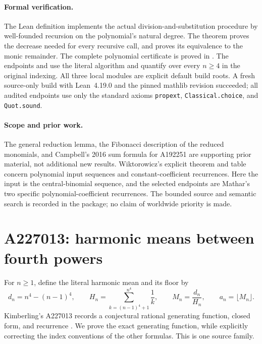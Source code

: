 \documentclass[11pt]{article}
\begin{document}
\paragraph{Formal verification.}
The Lean definition  implements the actual
division-and-substitution procedure by well-founded recursion on the
polynomial's natural degree. The theorem
 proves the decrease needed for every
recursive call, and  proves its
equivalence to the monic remainder. The complete polynomial certificate
is proved in . The endpoints
 and  use the
literal algorithm and quantify over every $n\geq4$ in the original
indexing. All three local modules are explicit default build roots.
A fresh source-only build with Lean~4.19.0 and the pinned mathlib revision
succeeded; all audited endpoints use only the standard axioms
\texttt{propext}, \texttt{Classical.choice}, and \texttt{Quot.sound}.

\paragraph{Scope and prior work.}
The general reduction lemma, the Fibonacci description of the reduced
monomials, and Campbell's 2016 sum formula for A192251 are supporting
prior material, not additional new results. Wiktorowicz's explicit
theorem and table concern polynomial input sequences and
constant-coefficient recurrences. Here the input is the central-binomial
sequence, and the selected endpoints are Mathar's two specific
polynomial-coefficient recurrences. The bounded source and semantic
search is recorded in the package; no claim of worldwide priority is
made.


\section{A227013: harmonic means between fourth powers}
\label{sec:quartic-harmonic}

For $n\ge1$, define the literal harmonic mean and its floor by
\[
 d_n=n^4-(n-1)^4,\qquad
 H_n=\sum_{k=(n-1)^4+1}^{n^4}\frac1k,\qquad
 M_n=\frac{d_n}{H_n},\qquad a_n=\lfloor M_n\rfloor.
\]
Kimberling's A227013 records a conjectural rational generating function,
closed form, and recurrence \cite{oeis227013}. We prove the exact generating
function, while explicitly correcting the index conventions of the other
formulas. This is one source family.
\end{document}
